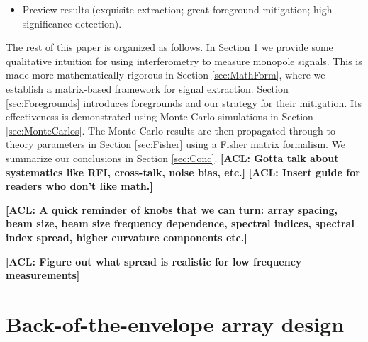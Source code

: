 \documentclass[twolcolumn,apj,iop,numberedappendix]{emulateapj}
\newcommand{\acl}[1]{{\color{red} \textbf{[ACL:  #1]}}}
\newcommand{\mep}[1]{{\color{applegreen} \textbf{[MEP:  #1]}}}
\begin{document}
\begin{itemize}
\item Preview results (exquisite extraction; great foreground mitigation; high significance detection).
\end{itemize}

The rest of this paper is organized as follows.  In Section \ref{sec:BackOfEnvelopeArrayDesign} we provide some qualitative intuition for using interferometry to measure monopole signals.  This is made more mathematically rigorous in Section \ref{sec:MathForm}, where we establish a matrix-based framework for signal extraction.  Section \ref{sec:Foregrounds} introduces foregrounds and our strategy for their mitigation.  Its effectiveness is demonstrated using Monte Carlo simulations in Section \ref{sec:MonteCarlos}.  The Monte Carlo results are then propagated through to theory parameters in Section \ref{sec:Fisher} using a Fisher matrix formalism.  We summarize our conclusions in Section \ref{sec:Conc}.
\acl{Gotta talk about systematics like RFI, cross-talk, noise bias, etc.}
\acl{Insert guide for readers who don't like math.}


\acl{A quick reminder of knobs that we can turn: array spacing, beam size, beam size frequency dependence, spectral indices, spectral index spread, higher curvature components etc.}

\acl{Figure out what spread is realistic for low frequency measurements}

\section{Back-of-the-envelope array design}
\label{sec:BackOfEnvelopeArrayDesign}
\end{document}
